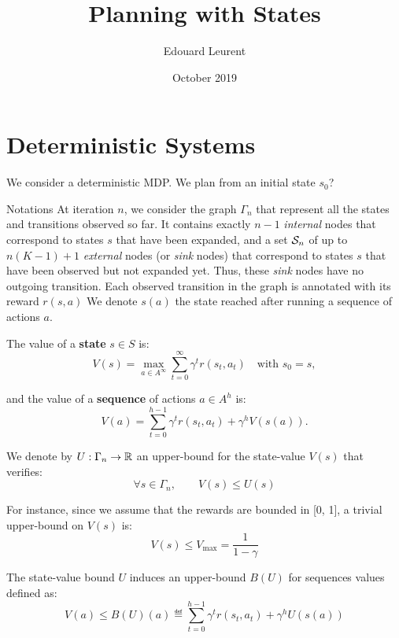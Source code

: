 \documentclass{article}
\title{Planning with States}
\author{Edouard Leurent}
\date{October 2019}
\begin{document}
\maketitle

\tableofcontents


\section{Deterministic Systems}

We consider a deterministic MDP. We plan from an initial state $s_0$?
\begin{paragraph}{Notations}
At iteration $n$, we consider the graph $\Gamma_n$ that represent all the states and transitions observed so far. It contains exactly $n-1$ \emph{internal} nodes that correspond to states $s$ that have been expanded, and a set $\mathcal{S}_n$ of up to $n(K-1)+1$ \emph{external} nodes (or \emph{sink} nodes) that correspond to states $s$ that have been observed but not expanded yet. Thus, these \emph{sink} nodes have no outgoing transition. Each observed transition in the graph is annotated with its reward $r(s,a)$
We denote $s(a)$ the state reached after running a sequence of actions $a$.
\end{paragraph}

\begin{definition}[Values]
The value of a \textbf{state} $s\in S$ is:
\begin{equation}
    V(s) = \max_{a\in A^\infty} \sum_{t=0}^\infty \gamma^t r(s_t, a_t) \quad \text{with $s_0=s$},
\end{equation}



and the value of a \textbf{sequence} of actions $a\in A^h$ is:
\begin{equation}
\label{eq:state_value}
    V(a) = \sum_{t=0}^{h-1}\gamma^t r(s_t, a_t) + \gamma^{h} V(s(a)).
\end{equation}
\end{definition}

\begin{definition}

We denote by $U:\Gamma_n \rightarrow \mathbb{R}$ an upper-bound for the state-value $V(s)$ that verifies:
\begin{equation*}
    \forall s\in\Gamma_n, \qquad V(s) \leq U(s)
\end{equation*}

For instance, since we assume that the rewards are bounded in [0, 1], a trivial upper-bound on $V(s)$ is:
\[V(s) \leq V_{\max} = \frac{1}{1-\gamma} \]

The state-value bound $U$ induces an upper-bound $B(U)$ for sequences values defined as:
\begin{equation}
\label{eq:sequence_value}
    V(a) \leq B(U)(a) \eqdef \sum_{t=0}^{h-1} \gamma^t r(s_t, a_t) + \gamma^{h} U(s(a))
\end{equation}
\end{definition}
\end{document}
